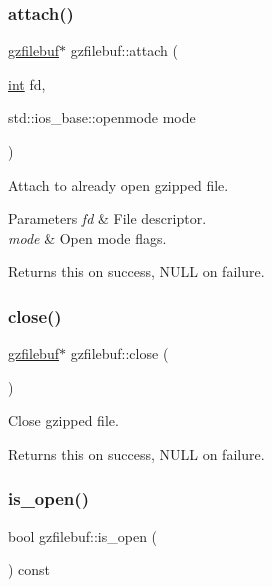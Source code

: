 \subsubsection{\texorpdfstring{attach()}{attach()}}
{\footnotesize\ttfamily \hyperlink{classgzfilebuf}{gzfilebuf}$\ast$ gzfilebuf\+::attach (\begin{DoxyParamCaption}\item[{\hyperlink{lp__lib_8h_adeb9ec6400320e4923ac9d836d509ddb}{int}}]{fd,  }\item[{std\+::ios\+\_\+base\+::openmode}]{mode }\end{DoxyParamCaption})}



Attach to already open gzipped file. 


\begin{DoxyParams}{Parameters}
{\em fd} & File descriptor. \\
\hline
{\em mode} & Open mode flags. \\
\hline
\end{DoxyParams}
\begin{DoxyReturn}{Returns}
{\ttfamily this} on success, N\+U\+LL on failure. 
\end{DoxyReturn}
\mbox{\label{classgzfilebuf_a280d1c661fb371c22de1214d5a1682a2}} 
\subsubsection{\texorpdfstring{close()}{close()}}
{\footnotesize\ttfamily \hyperlink{classgzfilebuf}{gzfilebuf}$\ast$ gzfilebuf\+::close (\begin{DoxyParamCaption}{ }\end{DoxyParamCaption})}



Close gzipped file. 

\begin{DoxyReturn}{Returns}
{\ttfamily this} on success, N\+U\+LL on failure. 
\end{DoxyReturn}
\mbox{\label{classgzfilebuf_a24dfb3e35c147aaf3a562c1ea4268757}} 
\subsubsection{\texorpdfstring{is\+\_\+open()}{is\_open()}}
{\footnotesize\ttfamily bool gzfilebuf\+::is\+\_\+open (\begin{DoxyParamCaption}{ }\end{DoxyParamCaption}) const\hspace{0.3cm}{\ttfamily [inline]}}



